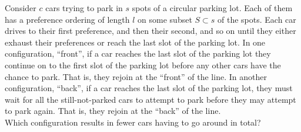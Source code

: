 Consider $c$ cars trying to park in $s$ spots of a circular parking lot. Each of them has a preference ordering of length $l$ on some subset $S \subset s$ of the spots. Each car drives to their first preference, and then their second, and so on until they either exhaust their preferences or reach the last slot of the parking lot. In one configuration, ``front'', if a car reaches the last slot of the parking lot they continue on to the first slot of the parking lot before any other cars have the chance to park. That is, they rejoin at the ``front'' of the line. In another configuration, ``back'', if a car reaches the last slot of the parking lot, they must wait for all the still-not-parked cars to attempt to park before they may attempt to park again. That is, they rejoin at the ``back'' of the line. \\

Which configuration results in fewer cars having to go around in total?

